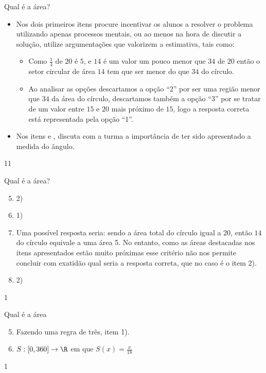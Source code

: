 \begin{sugestions}{Qual é a área?}
{
\begin{itemize}
\item Nos dois primeiros itens procure incentivar os alunos a resolver o problema utilizando apenas processos mentais, ou ao menos na hora de discutir a solução, utilize argumentações que valorizem a estimativa, tais como:

\begin{itemize}
\item Como $\frac{1}{4}$ de $20$ é $5$, e $14$ é um valor um pouco menor que $34$ de $20$ então o setor circular de área $14$ tem que ser menor do que $34$ do círculo.

\item Ao analisar as opções descartamos a opção “2” por ser uma região menor que $34$ da área do círculo, descartamos também a opção “3” por se tratar de um valor entre $15$ e $20$ mais próximo de $15$, logo a resposta correta está representada pela opção “1”.
\end{itemize}

\item Nos itens  e , discuta com a turma a importância de ter sido apresentado a medida do ângulo.
\end{itemize}
}{1}{1}
\end{sugestions}
\begin{answer}{Qual é a área?}
{
\begin{enumerate}\setcounter{enumi}{4}
\item 2)
\item 1)
\item Uma possível resposta seria: sendo a área total do círculo igual a $20$, então $14$ do círculo equivale a uma área 5. No entanto, como as áreas destacadas nos itens apresentados estão muito próximas esse critério não nos permite concluir com exatidão qual seria a resposta correta, que no caso é o item 2).
\item 2)
\end{enumerate}
}{1}
\end{answer}
\clearmargin
\begin{answer}{Qual é a área}
{
  \begin{enumerate}\setcounter{enumi}{4}
  \item Fazendo uma regra de três, item 1).
  \item $S:[0,360]\rightarrow\R$ em que $S(x)=\frac{x}{18}$
  \end{enumerate}
}{1}
\end{answer}

